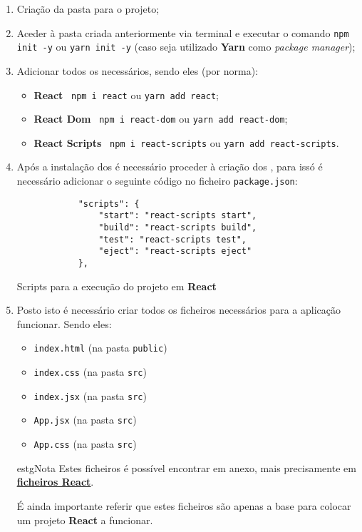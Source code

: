 \begin{enumerate}
	\item Criação da pasta para o projeto;
	\item Aceder à pasta criada anteriormente via terminal e executar o comando \texttt{npm init -y} ou \texttt{yarn init -y} {\scriptsize (caso seja utilizado \textbf{Yarn} como \textit{package manager})};
	\item Adicionar todos os \textit{} necessários, sendo eles {\scriptsize (por norma)}:
	\begin{itemize}
		\item \textbf{React} \textemdash~\texttt{npm i react} ou \texttt{yarn add react};
		\item \textbf{React Dom} \textemdash~\texttt{npm i react-dom} ou \texttt{yarn add react-dom};
		\item \textbf{React Scripts} \textemdash~\texttt{npm i react-scripts} ou \texttt{yarn add react-scripts}.
	\end{itemize}
	\item Após a instalação dos \textit{} é necessário proceder à criação dos \textit{}, para issó é necessário adicionar o seguinte código no ficheiro \texttt{package.json}:

	\begin{listing}
		\begin{verbatim}
			"scripts": {
				"start": "react-scripts start",
				"build": "react-scripts build",
				"test": "react-scripts test",
				"eject": "react-scripts eject"
			},
		\end{verbatim}
		\caption{Scripts para a execução do projeto em \textbf{React}}
	\end{listing}

	\item Posto isto é necessário criar todos os ficheiros necessários para a aplicação funcionar. Sendo eles:
	\begin{itemize}
		\item \texttt{index.html} {\scriptsize (na pasta \texttt{public})}
		\item \texttt{index.css} {\scriptsize (na pasta \texttt{src})}
		\item \texttt{index.jsx} {\scriptsize (na pasta \texttt{src})}
		\item \texttt{App.jsx} {\scriptsize (na pasta \texttt{src})}
		\item \texttt{App.css} {\scriptsize (na pasta \texttt{src})}
	\end{itemize}

	\vspace{0.25cm}
	\begin{mybox}{estg}{Nota}
		Estes ficheiros é possível encontrar em anexo, mais precisamente em \underline{\textbf{\hyperref[reactFiles]{ficheiros React}}}.


		É ainda importante referir que estes ficheiros são apenas a base para colocar um projeto \textbf{React} a funcionar.
	\end{mybox}
\end{enumerate}

